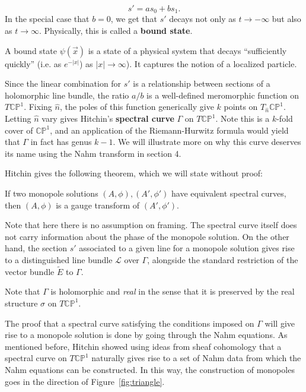 	\begin{equation}
		s' = a s_0 + b s_1.
	\end{equation}
	In the special case that $b=0$, we get that $s'$ decays not only as $t \to -\infty$ but also as $t \to \infty$. Physically, this is called a \textbf{bound state}.
	\begin{phys}
		A bound state $\psi(\vec x)$ is a state of a physical system that decays ``sufficiently quickly'' (i.e. as $e^{-|x|}$) as $|x| \to \infty$). It captures the notion of a localized particle. 
	\end{phys}
	Since the linear combination for $s'$ is a relationship between sections of a holomorphic line bundle, the ratio $a/b$ is a well-defined meromorphic function on $T \mathbb{CP}^1$. Fixing $\hat n$, the poles of this function generically give $k$ points on $T_{\hat n} \mathbb{CP}^1$. Letting $\hat n$ vary gives Hitchin's \textbf{spectral curve} $\Gamma$ on $T \mathbb {CP}^1$. Note this is a $k$-fold cover of $\mathbb{CP}^1$, and an application of the Riemann-Hurwitz formula would yield that $\Gamma$ in fact has genus $k-1$. We will illustrate more on why this curve deserves its name using the Nahm transform in section 4.
	
	Hitchin gives the following theorem, which we will state without proof:
	\begin{theorem}[Hitchin]
		If two monopole solutions $(A, \phi), (A', \phi')$ have equivalent spectral curves, then $(A, \phi)$ is a gauge transform of $(A', \phi')$.
	\end{theorem}
	Note that here there is no assumption on framing. The spectral curve itself does not carry information about the phase of the monopole solution. On the other hand, the section $s'$ associated to a given line for a monopole solution gives rise to a distinguished line bundle $\mathcal L$ over $\Gamma$, alongside the standard restriction of the vector bundle $\tilde E$ to $\Gamma$.
	
	Note that $\Gamma$ is holomorphic and \emph{real} in the sense that it is preserved by the real structure $\sigma$ on $T\mathbb{CP}^1$.
	
	The proof that a spectral curve satisfying the conditions imposed on $\Gamma$ will give rise to a monopole solution is done by going through the Nahm equations. As mentioned before, Hitchin \cite{hitchin1983} showed using ideas from sheaf cohomology that a spectral curve on $T \mathbb{CP}^1$ naturally gives rise to a set of Nahm data from which the Nahm equations can be constructed. In this way, the construction of monopoles goes in the direction of Figure~\ref{fig:triangle}.
	
